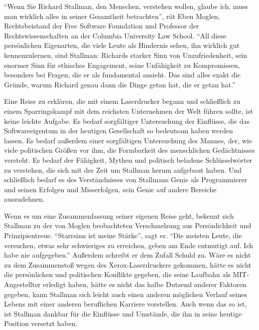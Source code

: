 "`Wenn Sie Richard Stallman, den Menschen, verstehen wollen, glaube ich, muss man wirklich alles in seiner Gesamtheit betrachten"', rät Eben Moglen, Rechtsbeistand der Free Software Foundation und Professor der Rechtswissenschaften an der Columbia University Law School. "`All diese persönlichen Eigenarten, die viele Leute als Hindernis sehen, ihn wirklich gut kennenzulernen, \glq sind\grq{} Stallman: Richards starker Sinn von Unzufriedenheit, sein enormer Sinn für ethisches Engagement, seine Unfähigkeit zu Kompromissen, besonders bei Fragen, die er als fundamental ansieht. Das sind alles exakt die Gründe, warum Richard genau dann die Dinge getan hat, die er getan hat."'

Eine Reise zu erklären, die mit einem Laserdrucker begann und schließlich zu einem Sparringskampf mit dem reichsten Unternehmen der Welt führen sollte, ist keine leichte Aufgabe. Es bedarf sorgfältiger Untersuchung der Einflüsse, die das Softwareeigentum in der heutigen Gesellschaft so bedeutsam haben werden lassen. Es bedarf außerdem einer sorgfältigen Untersuchung des Mannes, der, wie viele politischen Größen vor ihm, die Formbarkeit des menschlichen Gedächtnisses versteht.
Es bedarf der Fähigkeit, Mythen und politisch beladene Schlüsselwörter zu verstehen, die sich mit der Zeit um Stallman herum aufgebaut haben. Und schließlich bedarf es des Verständnisses von Stallmans Genie als Programmierer und seinen Erfolgen und Misserfolgen, sein Genie auf andere Bereiche auszudehnen.

Wenn es um eine Zusammenfassung seiner eigenen Reise geht, bekennt sich Stallman zu der von Moglen beobachteten Verschmelzung aus Persönlichkeit und Prinzipientreue. "`Starrsinn ist meine Stärke"', sagt er. "`Die meisten Leute, die versuchen, etwas sehr schwieriges zu erreichen, geben am Ende entmutigt auf. Ich habe nie aufgegeben."'
Außerdem schreibt er dem Zufall Schuld zu. Wäre es nicht zu dem Zusammenstoß wegen des Xerox-Laserdruckers gekommen, hätte es nicht die persönlichen und politischen Konflikte gegeben, die seine Laufbahn als MIT-Angestellter erledigt haben, hätte es nicht das halbe Dutzend anderer Faktoren gegeben, kann Stallman sich leicht auch einen anderen möglichen Verlauf seines Lebens mit einer anderen beruflichen Karriere vorstellen. Auch wenn das so ist, ist Stallman dankbar für die Einflüsse und Umstände, die ihn in seine heutige Position versetzt haben.